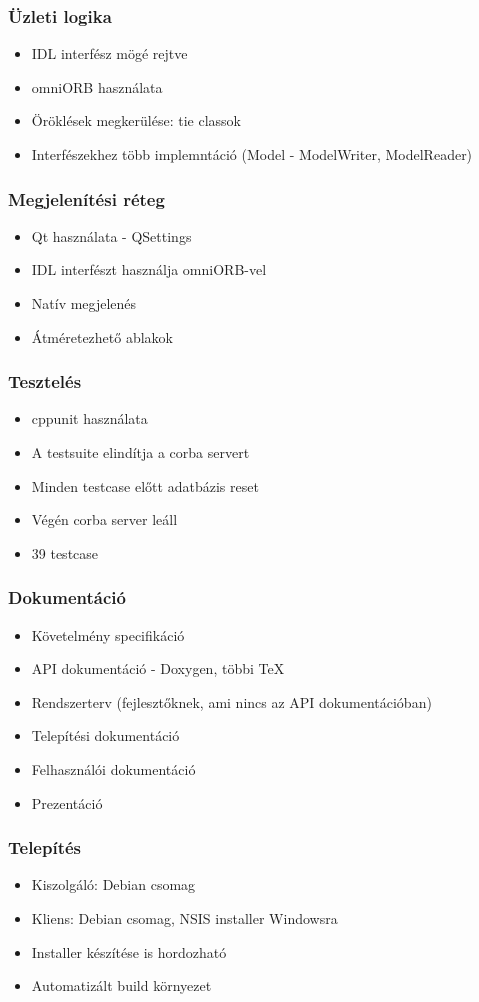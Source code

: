 \documentclass[hyperref={pdfpagelabels=false}]{beamer}
\begin{document}
\begin{frame}
\frametitle{Üzleti logika}
\begin{itemize}
\item IDL interfész mögé rejtve
\item omniORB használata
\item Öröklések megkerülése: tie classok
\item Interfészekhez több implemntáció (Model - ModelWriter, ModelReader)
\end{itemize}
\end{frame}

\begin{frame}
\frametitle{Megjelenítési réteg}
\begin{itemize}
\item Qt használata - QSettings
\item IDL interfészt használja omniORB-vel
\item Natív megjelenés
\item Átméretezhető ablakok
\end{itemize}
\end{frame}

\begin{frame}
\frametitle{Tesztelés}
\begin{itemize}
\item cppunit használata
\item A testsuite elindítja a corba servert
\item Minden testcase előtt adatbázis reset
\item Végén corba server leáll
\item 39 testcase
\end{itemize}
\end{frame}

\begin{frame}
\frametitle{Dokumentáció}
\begin{itemize}
\item Követelmény specifikáció
\item API dokumentáció - Doxygen, többi \TeX{}
\item Rendszerterv (fejlesztőknek, ami nincs az API dokumentációban)
\item Telepítési dokumentáció
\item Felhasználói dokumentáció
\item Prezentáció
\end{itemize}
\end{frame}

\begin{frame}
\frametitle{Telepítés}
\begin{itemize}
\item Kiszolgáló: Debian csomag
\item Kliens: Debian csomag, NSIS installer Windowsra
\item Installer készítése is hordozható
\item Automatizált build környezet
\end{itemize}
\end{frame}
\end{document}

